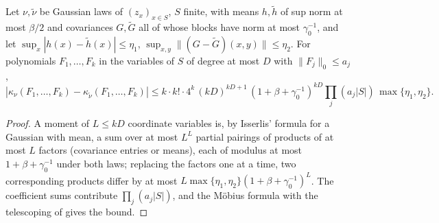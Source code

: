 \begin{lemma}\label{rot:lem:R1repl}
Let $\nu,\tilde\nu$ be Gaussian laws of $(z_x)_{x\in S}$, $S$ finite, with means $h,\tilde h$ of sup norm at most $\beta/2$ and covariances $G,\tilde G$ all of whose blocks have norm at most $\gamma_0^{-1}$, and let $\sup_x|h(x)-\tilde h(x)|\le\eta_1$, $\sup_{x,y}\|(G-\tilde G)(x,y)\|\le\eta_2$. For polynomials $F_1,\dots,F_k$ in the variables of $S$ of degree at most $D$ with $\|F_j\|_0\le a_j$,
\[
|\kappa_\nu(F_1,\dots,F_k)-\kappa_{\tilde\nu}(F_1,\dots,F_k)|\le k\cdot k!\cdot4^k\,(kD)^{kD+1}\,(1+\beta+\gamma_0^{-1})^{kD}\prod_j(a_j|S|)\,\max\{\eta_1,\eta_2\}.
\]
\end{lemma}
\begin{proof}
A moment of $L\le kD$ coordinate variables is, by Isserlis' formula for a Gaussian with mean, a sum over at most $L^L$ partial pairings of products of at most $L$ factors (covariance entries or means), each of modulus at most $1+\beta+\gamma_0^{-1}$ under both laws; replacing the factors one at a time, two corresponding products differ by at most $L\max\{\eta_1,\eta_2\}(1+\beta+\gamma_0^{-1})^L$. The coefficient sums contribute $\prod_j(a_j|S|)$, and the M\"obius formula with the telescoping of  gives the bound.
\end{proof}
